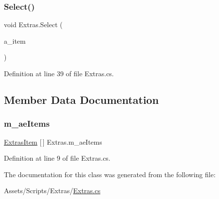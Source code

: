 \subsubsection{\texorpdfstring{Select()}{Select()}}
{\footnotesize\ttfamily void Extras.\+Select (\begin{DoxyParamCaption}\item[{\mbox{\hyperlink{class_extras_item}{Extras\+Item}}}]{a\+\_\+item }\end{DoxyParamCaption})}



Definition at line 39 of file Extras.\+cs.



\subsection{Member Data Documentation}
\mbox{\label{class_extras_af8d4902314e290df5f39c6e8dc3efb57}} 
\subsubsection{\texorpdfstring{m\+\_\+ae\+Items}{m\_aeItems}}
{\footnotesize\ttfamily \mbox{\hyperlink{class_extras_item}{Extras\+Item}} \mbox{[}$\,$\mbox{]} Extras.\+m\+\_\+ae\+Items}



Definition at line 9 of file Extras.\+cs.



The documentation for this class was generated from the following file\+:\begin{DoxyCompactItemize}
\item 
Assets/\+Scripts/\+Extras/\mbox{\hyperlink{_extras_8cs}{Extras.\+cs}}\end{DoxyCompactItemize}
